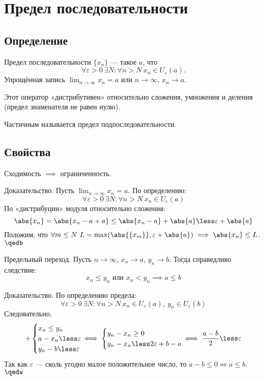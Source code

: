\section{Предел последовательности}


\subsection{Определение}

{\bold Предел} последовательности $\{x_n\}$ --- такое $a$, что
$$\forall\varepsilon\greater 0\ \exists N\colon\forall n\greater N\ x_n\in U_
\varepsilon(a).$$
Упрощённая запись $\lim_{n\to\infty}x_n=a$ или $n\to\infty$, $x_n\to a$.

Этот оператор {\ital «дистрибутивен»} относительно {\ital сложения}, {\ital умножения} и {\ital деления {\color{desc}(предел знаменателя не равен нулю)}}.

{\ital Частичным} называется предел подпоследовательности.

\subsection{Свойства}

Сходимость $\implies$ ограниченность.

{\bold Доказательство.} Пусть $\lim_{n\to\infty}x_n=a$. По определению:
$$\forall\varepsilon\greater 0\ \exists N\colon\forall n\greater N\ x_n\in U_
\varepsilon(a)$$
По «дистрибуции» модуля относительно сложения:
$$\abs{x_n}=\abs{x_n-a+a}\leq\abs{x_n-a}+\abs{a}\less\varepsilon+\abs{a}$$
Положим, что $\forall m\leq N\ L=\max(\abs{\{x_m\}},\varepsilon+\abs{a})\implies\abs{x_n}
\leq L$.$\qedb$

\begin{theorem}
{\bold Предельный переход.} Пусть $n\to\infty$, $x_n\to a$, $y_n\to b$. Тогда справедливо следствие:
$$x_n\leq y_n\text{ или }x_n\less y_n\implies a\leq b$$
\end{theorem}

{\bold Доказательство.} По определению предела:
$$\forall\varepsilon\greater 0\ \exists N\colon\forall n\greater N\ x_n\in U_
\varepsilon(a),\ y_n\in U_\varepsilon(b)$$
Следовательно,
$$+\begin{cases}
x_n\leq y_n\\
a-x_n\less\varepsilon\\
y_n-b\less\varepsilon
\end{cases}\hspace*{-12pt}\iff
\begin{cases}
y_n-x_n\geq 0\\
y_n-x_n\less 2\varepsilon+b-a
\end{cases}\hspace*{-12pt}\iff
\frac{a-b}{2}\less\varepsilon$$
Так как $\varepsilon$ --- сколь угодно малое положительное число, то $a-b\leq 0\iff a\leq 
b$.$\qedw$

